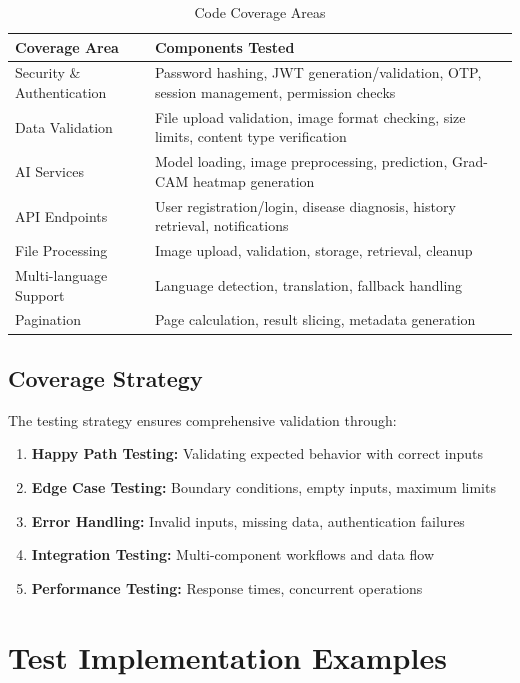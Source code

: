 \documentclass[12pt,a4paper]{article}
\begin{document}
\begin{table}[H]
\centering
\begin{tabular}{|l|p{8cm}|}
\hline
\textbf{Coverage Area} & \textbf{Components Tested} \\
\hline
Security \& Authentication & Password hashing, JWT generation/validation, OTP, session management, permission checks \\
\hline
Data Validation & File upload validation, image format checking, size limits, content type verification \\
\hline
AI Services & Model loading, image preprocessing, prediction, Grad-CAM heatmap generation \\
\hline
API Endpoints & User registration/login, disease diagnosis, history retrieval, notifications \\
\hline
File Processing & Image upload, validation, storage, retrieval, cleanup \\
\hline
Multi-language Support & Language detection, translation, fallback handling \\
\hline
Pagination & Page calculation, result slicing, metadata generation \\
\hline
\end{tabular}
\caption{Code Coverage Areas}
\end{table}

\subsection{Coverage Strategy}

The testing strategy ensures comprehensive validation through:

\begin{enumerate}
    \item \textbf{Happy Path Testing:} Validating expected behavior with correct inputs
    \item \textbf{Edge Case Testing:} Boundary conditions, empty inputs, maximum limits
    \item \textbf{Error Handling:} Invalid inputs, missing data, authentication failures
    \item \textbf{Integration Testing:} Multi-component workflows and data flow
    \item \textbf{Performance Testing:} Response times, concurrent operations
\end{enumerate}

\section{Test Implementation Examples}
\end{document}
